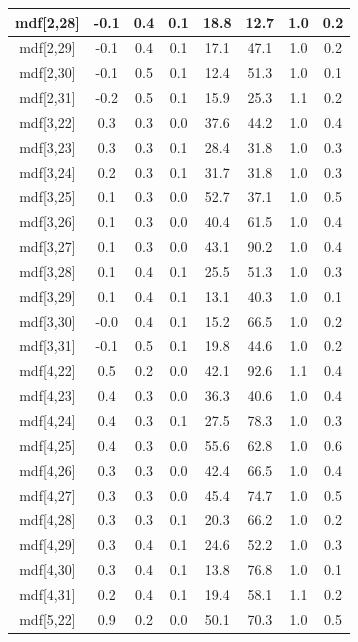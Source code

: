 \begin{longtable}{|c|c|c|c|c|c|c|c|}
\hline
mdf[2,28] & -0.1 & 0.4 & 0.1 & 18.8 & 12.7 & 1.0 & 0.2 \\
\hline
mdf[2,29] & -0.1 & 0.4 & 0.1 & 17.1 & 47.1 & 1.0 & 0.2 \\
\hline
mdf[2,30] & -0.1 & 0.5 & 0.1 & 12.4 & 51.3 & 1.0 & 0.1 \\
\hline
mdf[2,31] & -0.2 & 0.5 & 0.1 & 15.9 & 25.3 & 1.1 & 0.2 \\
\hline
mdf[3,22] & 0.3 & 0.3 & 0.0 & 37.6 & 44.2 & 1.0 & 0.4 \\
\hline
mdf[3,23] & 0.3 & 0.3 & 0.1 & 28.4 & 31.8 & 1.0 & 0.3 \\
\hline
mdf[3,24] & 0.2 & 0.3 & 0.1 & 31.7 & 31.8 & 1.0 & 0.3 \\
\hline
mdf[3,25] & 0.1 & 0.3 & 0.0 & 52.7 & 37.1 & 1.0 & 0.5 \\
\hline
mdf[3,26] & 0.1 & 0.3 & 0.0 & 40.4 & 61.5 & 1.0 & 0.4 \\
\hline
mdf[3,27] & 0.1 & 0.3 & 0.0 & 43.1 & 90.2 & 1.0 & 0.4 \\
\hline
mdf[3,28] & 0.1 & 0.4 & 0.1 & 25.5 & 51.3 & 1.0 & 0.3 \\
\hline
mdf[3,29] & 0.1 & 0.4 & 0.1 & 13.1 & 40.3 & 1.0 & 0.1 \\
\hline
mdf[3,30] & -0.0 & 0.4 & 0.1 & 15.2 & 66.5 & 1.0 & 0.2 \\
\hline
mdf[3,31] & -0.1 & 0.5 & 0.1 & 19.8 & 44.6 & 1.0 & 0.2 \\
\hline
mdf[4,22] & 0.5 & 0.2 & 0.0 & 42.1 & 92.6 & 1.1 & 0.4 \\
\hline
mdf[4,23] & 0.4 & 0.3 & 0.0 & 36.3 & 40.6 & 1.0 & 0.4 \\
\hline
mdf[4,24] & 0.4 & 0.3 & 0.1 & 27.5 & 78.3 & 1.0 & 0.3 \\
\hline
mdf[4,25] & 0.4 & 0.3 & 0.0 & 55.6 & 62.8 & 1.0 & 0.6 \\
\hline
mdf[4,26] & 0.3 & 0.3 & 0.0 & 42.4 & 66.5 & 1.0 & 0.4 \\
\hline
mdf[4,27] & 0.3 & 0.3 & 0.0 & 45.4 & 74.7 & 1.0 & 0.5 \\
\hline
mdf[4,28] & 0.3 & 0.3 & 0.1 & 20.3 & 66.2 & 1.0 & 0.2 \\
\hline
mdf[4,29] & 0.3 & 0.4 & 0.1 & 24.6 & 52.2 & 1.0 & 0.3 \\
\hline
mdf[4,30] & 0.3 & 0.4 & 0.1 & 13.8 & 76.8 & 1.0 & 0.1 \\
\hline
mdf[4,31] & 0.2 & 0.4 & 0.1 & 19.4 & 58.1 & 1.1 & 0.2 \\
\hline
mdf[5,22] & 0.9 & 0.2 & 0.0 & 50.1 & 70.3 & 1.0 & 0.5 \\

\end{longtable}
